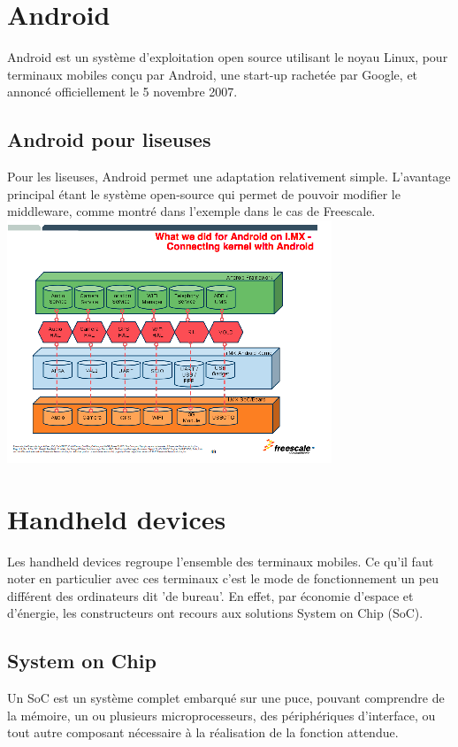 \section{Android}
Android est un système d'exploitation open source utilisant le noyau Linux, pour terminaux mobiles conçu par Android, une start-up rachetée par Google, et annoncé officiellement le 5 novembre 2007.
\subsection{Android pour liseuses}
Pour les liseuses, Android permet une adaptation relativement simple. L'avantage principal étant le système open-source qui permet de pouvoir modifier le middleware, comme montré dans l'exemple dans le cas de Freescale.\\
\includegraphics{pileAndroidLiseuse.png}
\section{Handheld devices}
Les handheld devices regroupe l'ensemble des terminaux mobiles. Ce qu'il faut noter en particulier avec ces terminaux c'est le mode de fonctionnement un peu différent des ordinateurs dit 'de bureau'. En effet, par économie d'espace et d'énergie, les constructeurs ont recours aux solutions System on Chip (SoC).
\subsection{System on Chip}
Un SoC est un système complet embarqué sur une puce, pouvant comprendre de la mémoire, un ou plusieurs microprocesseurs, des périphériques d'interface, ou tout autre composant nécessaire à la réalisation de la fonction attendue.
